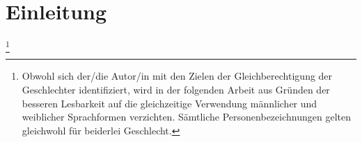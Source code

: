 

\section*{Einleitung}


\footnote{Obwohl sich der/die Autor/in mit den Zielen der Gleichberechtigung der Geschlechter identifiziert, wird in der folgenden Arbeit aus Gründen der besseren Lesbarkeit auf die gleichzeitige Verwendung männlicher und weiblicher Sprachformen verzichten. Sämtliche Personenbezeichnungen gelten gleichwohl für beiderlei Geschlecht.}